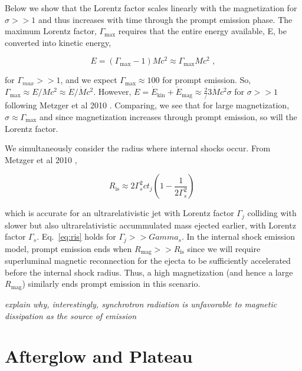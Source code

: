 \documentclass{article}
\begin{document}
Below we show that the Lorentz factor scales linearly with the magnetization for $\sigma >>1$ and thus increases with time through the prompt emission phase.
The maximum Lorentz factor, $\Gamma_{\mathrm{max}}$ requires that the entire energy available, E, be  converted into kinetic energy,

\begin{equation} E = (\Gamma_{\mathrm{max}}-1) M c^2 \approx \Gamma_{\mathrm{max}} M c^2 \,\,,
\end{equation}

for $\Gamma_{max}>>1$, and we expect $\Gamma_{\mathrm{max}}\approx 100$ for prompt emission. So, $\Gamma_{\mathrm{max}} \approx E/{M c^2} \approx \dot{E}/\dot{M} c^2$. However, $E=\dot{E}_{\mathrm{kin}}+\dot{E}_{\mathrm{mag}} \approx \frac{2}/{3} \dot{M} c^2 \sigma$ for $\sigma>>1$ following Metzger et al 2010 \cite{Metzger:2010pp}. Comparing, we see that for large magnetization, $\sigma \approx \Gamma_{\mathrm{max}}$ and since magnetization increases through prompt emission, so will the Lorentz factor.

We simultaneously consider the radius where internal shocks occur. From Metzger et al 2010 \cite{Metzger:2010pp},

\begin{equation}\label{eq:ris}
R_{\mathrm{is}} \approx 2\Gamma_s^2 c t_j(1-\frac{1}{2\Gamma_s^2})\,\,
\end{equation}

which is accurate for an ultrarelativistic jet with Lorentz factor $\Gamma_j$ colliding with slower but also ultrarelativistic accummulated mass ejected earlier, with Lorentz factor $\Gamma_s$. Eq.~\ref{eq:ris} holds for $\Gamma_{j}>>Gamma_{s}$. In the internal shock emission model, prompt emission ends when $R_{\mathrm{mag}}>>R_{\mathrm{is}}$ since we will require superluminal magnetic reconnection for the ejecta to be sufficiently accelerated before the internal shock radius. Thus, a high magnetization (and hence a large $R_{\mathrm{mag}}$) similarly ends prompt emission in this scenario.

\textit{explain why, interestingly, synchrotron radiation is unfavorable to magnetic dissipation as the source of emission}

\section{Afterglow and Plateau}
\end{document}
